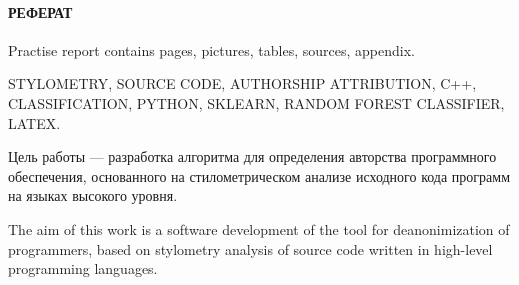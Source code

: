 \newpage
{}
\paragraph{\hfill РЕФЕРАТ \hfill}
Practise report contains  pages,  pictures,  tables,
 sources,  appendix.

STYLOMETRY, SOURCE CODE, AUTHORSHIP ATTRIBUTION, C++, CLASSIFICATION, PYTHON, SKLEARN,
RANDOM FOREST CLASSIFIER, LATEX.

Цель работы --- разработка алгоритма для определения авторства программного обеспечения, 
основанного на стилометрическом анализе исходного кода программ на языках высокого уровня.

The aim of this work is a software development of the tool for deanonimization of programmers, 
based on stylometry analysis of source code written in high-level programming languages.  